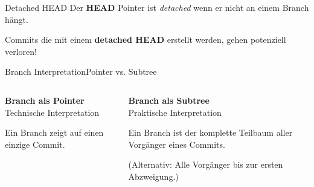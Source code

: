 \documentclass{setbeamer}
\begin{document}
\begin{frame}[c]{Detached HEAD}
    Der \textbf{HEAD} Pointer ist \emph{detached} wenn er nicht an einem Branch hängt.

    \begin{TUMBoxFill}[orange]{}{}
        Commits die mit einem \textbf{detached HEAD} erstellt werden, gehen potenziell verloren!
    \end{TUMBoxFill}
\end{frame}

\begin{frame}[c]{Branch Interpretation}{Pointer vs. Subtree}
    \begin{columns}[T]
        \begin{column}{0.5\textwidth}
            \textbf{Branch als Pointer}\\Technische Interpretation

            \vspace{3mm}
            Ein Branch zeigt auf einen einzige Commit.
        \end{column}

        \begin{column}{0.5\textwidth}
            \textbf{Branch als Subtree}\\Praktische Interpretation

            \vspace{3mm}
            Ein Branch ist der komplette Teilbaum aller Vorgänger eines Commits.

            \begin{footnotesize}
                (Alternativ: Alle Vorgänger bis zur ersten Abzweigung.)
            \end{footnotesize}
        \end{column}
    \end{columns}
\end{frame}
\end{document}
